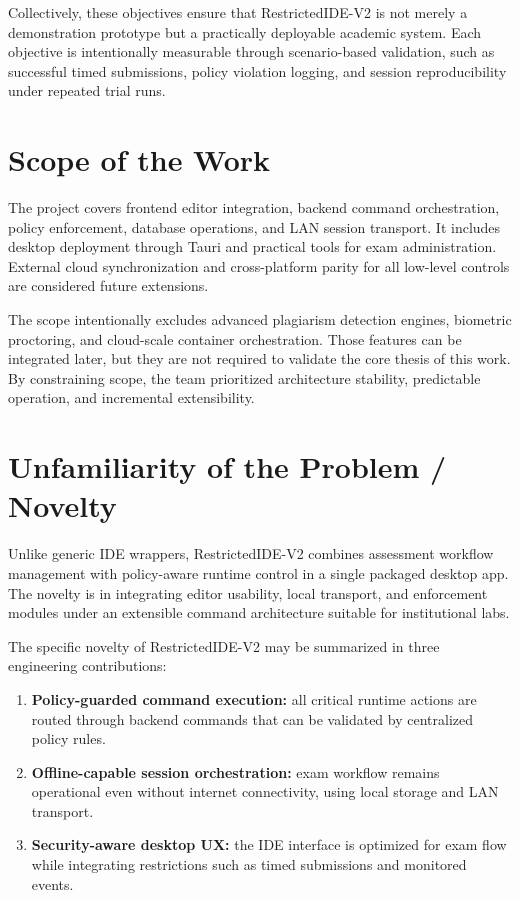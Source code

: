\documentclass[12pt,a4paper]{report}
\begin{document}
	Collectively, these objectives ensure that RestrictedIDE-V2 is not merely a demonstration prototype but a practically deployable academic system. Each objective is intentionally measurable through scenario-based validation, such as successful timed submissions, policy violation logging, and session reproducibility under repeated trial runs.
	
	\section{Scope of the Work}
	The project covers frontend editor integration, backend command orchestration, policy enforcement, database operations, and LAN session transport. It includes desktop deployment through Tauri and practical tools for exam administration. External cloud synchronization and cross-platform parity for all low-level controls are considered future extensions.
	
	The scope intentionally excludes advanced plagiarism detection engines, biometric proctoring, and cloud-scale container orchestration. Those features can be integrated later, but they are not required to validate the core thesis of this work. By constraining scope, the team prioritized architecture stability, predictable operation, and incremental extensibility.
	
	\section{Unfamiliarity of the Problem / Novelty}
	Unlike generic IDE wrappers, RestrictedIDE-V2 combines assessment workflow management with policy-aware runtime control in a single packaged desktop app. The novelty is in integrating editor usability, local transport, and enforcement modules under an extensible command architecture suitable for institutional labs.
	
	The specific novelty of RestrictedIDE-V2 may be summarized in three engineering contributions:
	\begin{enumerate}
		\item \textbf{Policy-guarded command execution:} all critical runtime actions are routed through backend commands that can be validated by centralized policy rules.
		\item \textbf{Offline-capable session orchestration:} exam workflow remains operational even without internet connectivity, using local storage and LAN transport.
		\item \textbf{Security-aware desktop UX:} the IDE interface is optimized for exam flow while integrating restrictions such as timed submissions and monitored events.
	\end{enumerate}
	
\end{document}
